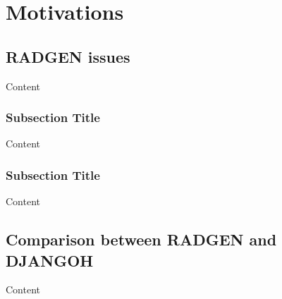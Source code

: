 
\chapter{Motivations} %

\label{ch:Motivations} %


\section{RADGEN issues}

Content


\subsection{Subsection Title}

Content


\subsection{Subsection Title}

Content


\section{Comparison between RADGEN and DJANGOH}

Content
